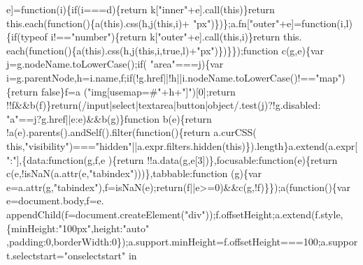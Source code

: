 \begin{DoxyCode}
      e]=\textcolor{keyword}{function}(i)\{\textcolor{keywordflow}{if}(i===d)\{\textcolor{keywordflow}{return} k[\textcolor{stringliteral}{"inner"}+e].call(\textcolor{keyword}{this})\}\textcolor{keywordflow}{return} this.each(\textcolor{keyword}{function}()\{a(\textcolor{keyword}{this}).css(h,j(\textcolor{keyword}{this},i)+\textcolor{stringliteral}{
      "px"})\})\};a.fn[\textcolor{stringliteral}{"outer"}+e]=\textcolor{keyword}{function}(i,l)\{\textcolor{keywordflow}{if}(typeof i!==\textcolor{stringliteral}{"number"})\{\textcolor{keywordflow}{return} k[\textcolor{stringliteral}{"outer"}+e].call(\textcolor{keyword}{this},i)\}\textcolor{keywordflow}{return} this.
      each(\textcolor{keyword}{function}()\{a(\textcolor{keyword}{this}).css(h,j(\textcolor{keyword}{this},i,\textcolor{keyword}{true},l)+\textcolor{stringliteral}{"px"})\})\}\});\textcolor{keyword}{function} c(g,e)\{var j=g.nodeName.toLowerCase();\textcolor{keywordflow}{if}(\textcolor{stringliteral}{
      "area"}===j)\{var i=g.parentNode,h=i.name,f;\textcolor{keywordflow}{if}(!g.href||!h||i.nodeName.toLowerCase()!==\textcolor{stringliteral}{"map"})\{\textcolor{keywordflow}{return} \textcolor{keyword}{false}\}f=a
      (\textcolor{stringliteral}{"img[usemap=#"}+h+\textcolor{stringliteral}{"]"})[0];\textcolor{keywordflow}{return} !!f&&b(f)\}\textcolor{keywordflow}{return}(/input|select|textarea|button|\textcolor{keywordtype}{object}/.test(j)?!g.disabled:\textcolor{stringliteral}{
      "a"}==j?g.href||e:e)&&b(g)\}\textcolor{keyword}{function} b(e)\{\textcolor{keywordflow}{return} !a(e).parents().andSelf().filter(\textcolor{keyword}{function}()\{\textcolor{keywordflow}{return} a.curCSS(\textcolor{keyword}{
      this},\textcolor{stringliteral}{"visibility"})===\textcolor{stringliteral}{"hidden"}||a.expr.filters.hidden(\textcolor{keyword}{this})\}).length\}a.extend(a.expr[\textcolor{stringliteral}{":"}],\{data:function(g,f,e
      )\{return !!a.data(g,e[3])\},focusable:\textcolor{keyword}{function}(e)\{return c(e,!isNaN(a.attr(e,\textcolor{stringliteral}{"tabindex"})))\},tabbable:\textcolor{keyword}{function}
      (g)\{var e=a.attr(g,\textcolor{stringliteral}{"tabindex"}),f=isNaN(e);return(f||e>=0)&&c(g,!f)\}\});a(\textcolor{keyword}{function}()\{var e=document.body,f=e.
      appendChild(f=document.createElement(\textcolor{stringliteral}{"div"}));f.offsetHeight;a.extend(f.style,\{minHeight:\textcolor{stringliteral}{"100px"},height:\textcolor{stringliteral}{"auto"}
      ,padding:0,borderWidth:0\});a.support.minHeight=f.offsetHeight===100;a.support.selectstart=\textcolor{stringliteral}{"onselectstart"} in

\end{DoxyCode}
